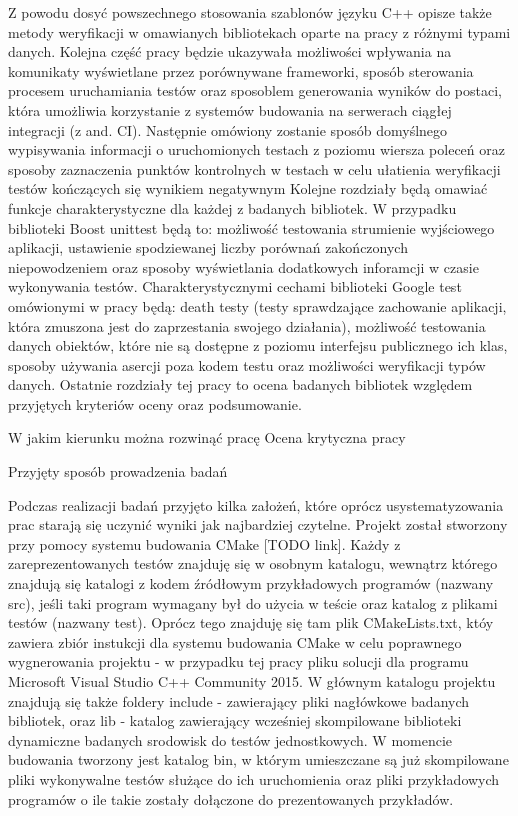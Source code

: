 Z powodu dosyć powszechnego stosowania szablonów języku C++ opisze także metody weryfikacji w omawianych bibliotekach oparte na pracy z różnymi typami danych.
Kolejna część pracy będzie ukazywała możliwości wpływania na komunikaty wyświetlane przez porównywane frameworki, sposób sterowania procesem uruchamiania testów oraz sposoblem generowania wyników do postaci, która umożliwia korzystanie z systemów budowania na serwerach ciągłej integracji (z and. CI).
Następnie omówiony zostanie sposób domyślnego wypisywania informacji o uruchomionych testach z poziomu wiersza poleceń oraz sposoby zaznaczenia punktów kontrolnych w testach w celu ułatienia weryfikacji testów kończących się wynikiem negatywnym
Kolejne rozdziały będą omawiać funkcje charakterystyczne dla każdej z badanych bibliotek.
W przypadku biblioteki Boost unittest będą to: możliwość testowania strumienie wyjściowego aplikacji, ustawienie spodziewanej liczby porównań zakończonych niepowodzeniem oraz sposoby wyświetlania dodatkowych inforamcji w czasie wykonywania testów.
Charakterystycznymi cechami biblioteki Google test omówionymi w pracy będą: death testy (testy sprawdzające zachowanie aplikacji, która zmuszona jest do zaprzestania swojego działania), możliwość testowania danych obiektów, które nie są dostępne z poziomu interfejsu publicznego ich klas, sposoby używania asercji poza kodem testu oraz możliwości weryfikacji typów danych.
Ostatnie rozdziały tej pracy to ocena badanych bibliotek względem przyjętych kryteriów oceny oraz podsumowanie.

W jakim kierunku można rozwinąć pracę
Ocena krytyczna pracy

Przyjęty sposób prowadzenia badań

Podczas realizacji badań przyjęto kilka założeń, które oprócz usystematyzowania prac starają się uczynić wyniki jak najbardziej czytelne.
Projekt został stworzony przy pomocy systemu budowania CMake [TODO link].
Każdy z zareprezentowanych testów znajduję się w osobnym katalogu, wewnątrz którego znajdują się katalogi z kodem źródłowym przykładowych programów (nazwany src), jeśli taki program wymagany był do użycia w teście oraz katalog z plikami testów (nazwany test). Oprócz tego znajduję się tam plik CMakeLists.txt, któy zawiera zbiór instukcji dla systemu budowania CMake w celu poprawnego wygnerowania projektu - w przypadku tej pracy pliku solucji dla programu Microsoft Visual Studio C++ Community 2015.
W głównym katalogu projektu znajdują się także foldery include - zawierający pliki nagłówkowe badanych bibliotek, oraz lib - katalog zawierający wcześniej skompilowane biblioteki dynamiczne badanych srodowisk do testów jednostkowych.
W momencie budowania tworzony jest katalog bin, w którym umieszczane są już skompilowane pliki wykonywalne testów służące do ich uruchomienia oraz pliki przykładowych programów o ile takie zostały dołączone do prezentowanych przykładów.

